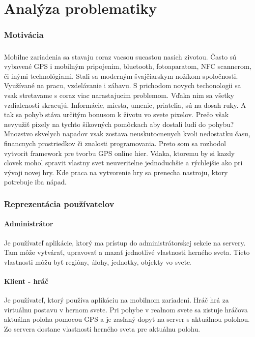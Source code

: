 \chapter{Analýza problematiky}
\subsection{Motivácia}
\paragraph{}
Mobilne zariadenia sa stavaju coraz vacsou sucastou nasich zivotou. Často sú vybavené GPS i mobilným pripojenim, bluetooth, fotoaparatom, NFC scannerom, či inými technológiami. Stali sa moderným švajčiarskym nožíkom spoločnosti. Využívané na pracu, vzdelávanie i zábavu. S prichodom novych techonologii sa vsak stretavame s coraz viac narastajucim problemom. Vďaka nim sa všetky vzdialenosti skracujú. Informácie, miesta, umenie, priatelia, sú na dosah ruky. A tak sa pohyb stáva určitým bonusom k životu vo svete pixelov. Prečo však nevyužiť pixely na tychto šikovných pomôckach aby dostali ludí do pohybu?\\
Mnozstvo skvelych napadov vsak zostava neuskutocnenych kvoli nedostatku času, financnych prostriedkov či znalosti programovania. Preto som sa rozhodol vytvorit framework pre tvorbu GPS online hier. Vdaka, ktoremu by si kazdy clovek mohol spravit vlastny svet neuveritelne jednoduchšie a rýchlejšie ako pri vývoji novej hry. Kde praca na vytvorenie hry sa prenecha nastroju, ktory potrebuje iba nápad.

\subsection{Reprezentácia používatelov}
\subsubsection{Administrátor}
Je používateľ aplikácie, ktorý ma prístup do administrátorskej sekcie na servery. Tam môže vytvárať, upravovať a mazať jednotlivé vlastnosti herného sveta. Tieto vlastnosti môžu byť regióny, úlohy, jednotky, objekty vo svete. 

\subsubsection{Klient - hráč}
Je používateľ, ktorý používa aplikáciu na mobilnom zariadení. Hráč hrá za virtuálnu postavu v hernom svete. Pri pohybe v realnom svete sa zistuje hráčova aktuálna poloha pomocou GPS a je zaslaný dopyt na server s aktuálnou polohou. Zo servera dostane vlastnosti herného sveta pre aktuálnu polohu.

